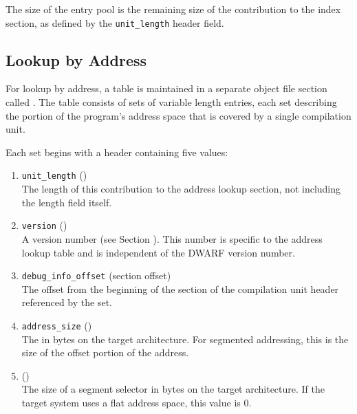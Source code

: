 The size of the entry pool is the remaining size of the contribution to
the index section, as defined by the \texttt{unit\_length} header field.

\subsection{Lookup by Address}
\label{chap:lookupbyaddress}
For 
lookup by address, a table is maintained in a separate
object file section called 
\dotdebugaranges{}. The table consists
of sets of variable length entries, each set describing the
portion of the program\textquoteright{}s address space that is covered by
a single compilation unit.

Each set begins with a header containing five values:
\begin{enumerate}[1. ]
\item \texttt{unit\_length} () \\
The length of this contribution to the address lookup section,
not including the length field itself.

\item \texttt{version} (\HFTuhalf) \\
A version number
(see Section ). 
This number is specific to the address lookup table and is
independent of the DWARF version number.

\item \texttt{debug\_info\_offset} (section offset) \\
The offset from the
beginning of the \dotdebuginfo{} section of the
compilation unit header referenced by the set.

\item \texttt{address\_size} (\HFTubyte) \\
The 
in bytes on
the target architecture. For 
segmented addressing, this is
the size of the offset portion of the address.

\item \HFNsegmentselectorsize{} (\HFTubyte) \\
The size of a segment selector in
bytes on the target architecture. If the target system uses
a flat address space, this value is 0.

\end{enumerate}

